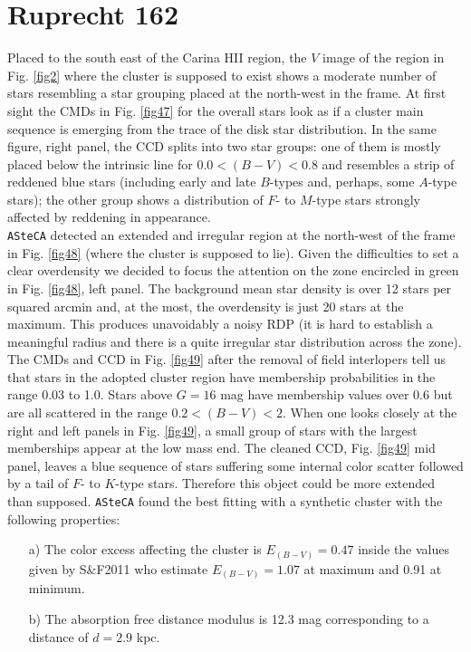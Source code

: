 \documentclass[draft]{aa}
\begin{document}
\section{Ruprecht 162}
\label{app:rup162}

Placed to the south east of the Carina HII region, the $V$ image of the region
in Fig. \ref{fig2} where the cluster is supposed to exist shows a moderate
number of stars resembling a star grouping placed at the north-west in the
frame. At first sight the CMDs in Fig. \ref{fig47} for the overall stars look
as if a cluster main sequence is emerging from the trace of the disk star
distribution.
In the same figure, right panel, the CCD splits into two star groups: one of
them is mostly placed below the intrinsic line for $0.0<(B-V)< 0.8$ and
resembles a strip of reddened blue stars (including early and late $B$-types
and, perhaps, some $A$-type stars); the other group shows a distribution of $F$-
to $M$-type stars strongly affected by reddening in appearance.\\

\texttt{ASteCA} detected an extended and irregular region at the north-west of
the frame in Fig. \ref{fig48} (where the cluster is supposed to lie). Given the
difficulties to set a clear overdensity we decided to focus the attention on the
zone encircled in green in Fig. \ref{fig48}, left panel. The background mean star
density is over 12 stars per squared arcmin and, at the most, the overdensity is
just 20 stars at the maximum. This produces unavoidably a noisy RDP (it is hard
to establish a meaningful radius and there is a quite irregular star
distribution across the zone).
%
The CMDs and CCD in Fig. \ref{fig49} after the removal of field interlopers tell
us that stars in the adopted cluster region have membership probabilities in the
range 0.03 to 1.0. Stars above $G=16$ mag have membership values over 0.6 but
are all scattered in the range $0.2<(B-V)<2$. When one looks closely at the
right and left panels in Fig. \ref{fig49}, a small group of stars with the
largest memberships appear at the low mass end.
The cleaned CCD, Fig. \ref{fig49} mid panel, leaves a blue sequence of stars
suffering some internal color scatter followed by a tail of $F$- to $K$-type
stars. Therefore this object could be more extended than supposed. 
\texttt{ASteCA} found the best fitting with a synthetic cluster with the
following properties:

\begin{itemize}
\item [a)] The color excess affecting the cluster is $E_{(B-V)} =0.47$ inside
the values given by S\&F2011 who estimate $E_{(B-V)} = 1.07$ at maximum and
0.91 at minimum. 
\item [b)] The absorption free distance modulus is 12.3 mag corresponding to a
distance of $d = 2.9$ kpc.
\end{itemize}
\end{document}

